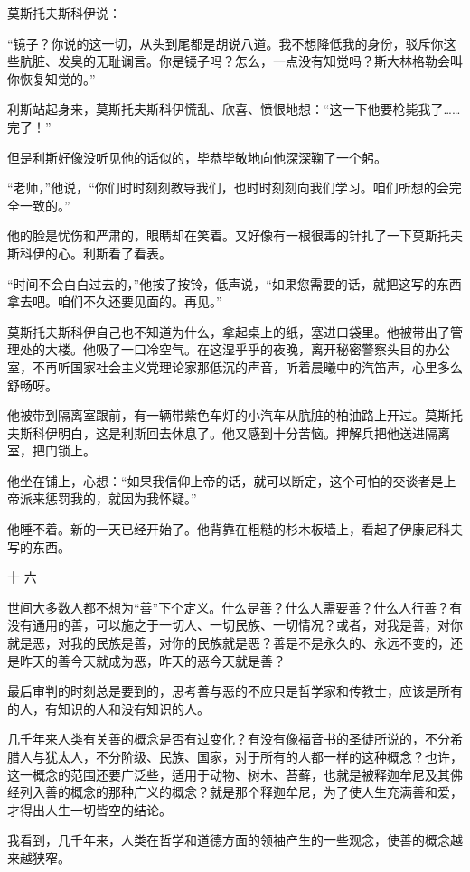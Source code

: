莫斯托夫斯科伊说：

“镜子？你说的这一切，从头到尾都是胡说八道。我不想降低我的身份，驳斥你这些肮脏、发臭的无耻谰言。你是镜子吗？怎么，一点没有知觉吗？斯大林格勒会叫你恢复知觉的。”

利斯站起身来，莫斯托夫斯科伊慌乱、欣喜、愤恨地想：“这一下他要枪毙我了……完了！”

但是利斯好像没听见他的话似的，毕恭毕敬地向他深深鞠了一个躬。

“老师，”他说，“你们时时刻刻教导我们，也时时刻刻向我们学习。咱们所想的会完全一致的。”

他的脸是忧伤和严肃的，眼睛却在笑着。又好像有一根很毒的针扎了一下莫斯托夫斯科伊的心。利斯看了看表。

“时间不会白白过去的，”他按了按铃，低声说，“如果您需要的话，就把这写的东西拿去吧。咱们不久还要见面的。再见。”

莫斯托夫斯科伊自己也不知道为什么，拿起桌上的纸，塞进口袋里。他被带出了管理处的大楼。他吸了一口冷空气。在这湿乎乎的夜晚，离开秘密警察头目的办公室，不再听国家社会主义党理论家那低沉的声音，听着晨曦中的汽笛声，心里多么舒畅呀。

他被带到隔离室跟前，有一辆带紫色车灯的小汽车从肮脏的柏油路上开过。莫斯托夫斯科伊明白，这是利斯回去休息了。他又感到十分苦恼。押解兵把他送进隔离室，把门锁上。

他坐在铺上，心想：“如果我信仰上帝的话，就可以断定，这个可怕的交谈者是上帝派来惩罚我的，就因为我怀疑。”

他睡不着。新的一天已经开始了。他背靠在粗糙的杉木板墙上，看起了伊康尼科夫写的东西。

十 六

世间大多数人都不想为“善”下个定义。什么是善？什么人需要善？什么人行善？有没有通用的善，可以施之于一切人、一切民族、一切情况？或者，对我是善，对你就是恶，对我的民族是善，对你的民族就是恶？善是不是永久的、永远不变的，还是昨天的善今天就成为恶，昨天的恶今天就是善？

最后审判的时刻总是要到的，思考善与恶的不应只是哲学家和传教士，应该是所有的人，有知识的人和没有知识的人。

几千年来人类有关善的概念是否有过变化？有没有像福音书的圣徒所说的，不分希腊人与犹太人，不分阶级、民族、国家，对于所有的人都一样的这种概念？也许，这一概念的范围还要广泛些，适用于动物、树木、苔藓，也就是被释迦牟尼及其佛经列入善的概念的那种广义的概念？就是那个释迦牟尼，为了使人生充满善和爱，才得出人生一切皆空的结论。

我看到，几千年来，人类在哲学和道德方面的领袖产生的一些观念，使善的概念越来越狭窄。

